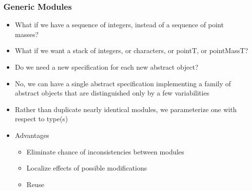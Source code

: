 \documentclass[t,12pt,numbers,fleqn,handout]{beamer}
\begin{document}


\begin{frame}
\frametitle{Generic Modules}

\begin{itemize}
\item What if we have a sequence of integers, instead of a sequence of point masses?
\item What if we want a stack of integers, or characters, or pointT, or pointMassT?
\item Do we need a new specification for each new abstract object?
\item No, we can have a single abstract specification implementing a family of abstract objects that are distinguished
only by a few variabilities
\item Rather than duplicate nearly identical modules, we parameterize one  with respect to
type(s)
\item Advantages
\begin{itemize}
\item Eliminate chance of inconsistencies between modules
\item Localize effects of possible modifications
\item Reuse
\end{itemize}
\end{itemize}

\end{frame}
\end{document}
